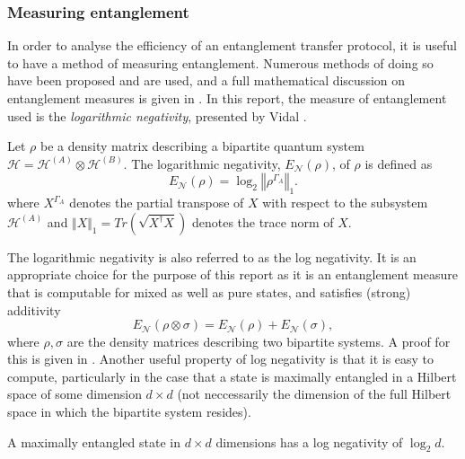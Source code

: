 \subsubsection{Measuring entanglement}
\label{subsubsection:measure_entanglement}
In order to analyse the efficiency of an entanglement transfer protocol, it is useful to have a method of measuring entanglement.
Numerous methods of doing so have been proposed and are used, and a full
mathematical discussion on entanglement measures is given in \cite{Plenio_2007}.
In this report, the measure of entanglement used is the \emph{logarithmic negativity}, presented by Vidal \cite{Vidal_2002}.
\begin{definition}
    \label{definition:log_neg}
    Let $\rho$ be a density matrix describing a bipartite quantum system $\mathcal{H} = \mathcal{H}^{(A)} \otimes \mathcal{H}^{(B)}$.
    The logarithmic negativity, $E_\mathcal{N}(\rho)$, of $\rho$ is defined as
    \begin{equation}
        E_\mathcal{N}(\rho) = \log_2\left\Vert \rho^{\Gamma_A}\right\Vert_1.
    \end{equation}
    where $X^{\Gamma_A}$ denotes the partial transpose of $X$ with respect to the subsystem $\mathcal{H}^{(A)}$ and $\Vert X\Vert_1 = Tr(\sqrt{X^\dagger X})$ denotes the trace norm of $X$.
\end{definition}
The logarithmic negativity is also referred to as the log negativity.
It is an appropriate choice for the purpose of this report as it is an entanglement measure that is computable for mixed as well as pure states, and satisfies (strong) additivity
\begin{equation}
    E_\mathcal{N}(\rho \otimes \sigma) = E_\mathcal{N}(\rho) + E_\mathcal{N}(\sigma),
\end{equation}
where $\rho,\sigma$ are the density matrices describing two bipartite systems.
A proof for this is given in \cite{Vidal_2002}.
Another useful property of log negativity is that it is easy to compute, particularly in the case that a state is maximally entangled in a Hilbert space of some dimension $d\times d$ (not neccessarily the dimension of the full Hilbert space in which the bipartite system resides).
\begin{claim}
    \label{claim:maximally_entangled_states}
    A maximally entangled state in $d\times d$ dimensions has a log negativity of $\log_2d$.
\end{claim}
